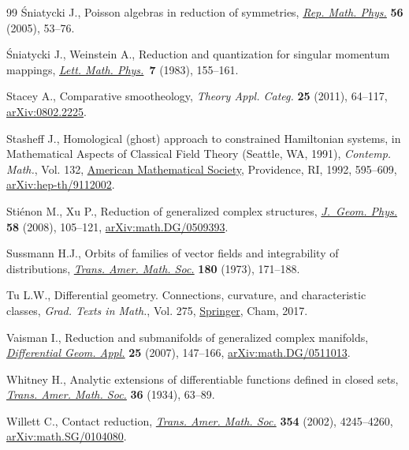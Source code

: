 \begin{thebibliography}{99}
\'Sniatycki J., Poisson algebras in reduction of symmetries, \href{https://doi.org/10.1016/S0034-4877(05)80041-2}{\textit{Rep. Math.
  Phys.}} \textbf{56} (2005), 53--76.

\'Sniatycki J., Weinstein A., Reduction and quantization for singular momentum
  mappings, \href{https://doi.org/10.1007/BF00419934}{\textit{Lett. Math. Phys.}}~\textbf{7} (1983), 155--161.

Stacey A., Comparative smootheology, \textit{Theory Appl. Categ.} \textbf{25}
  (2011), 64--117, \href{https://arxiv.org/abs/0802.2225}{arXiv:0802.2225}.

Stasheff J., Homological (ghost) approach to constrained {H}amiltonian systems,
  in Mathematical Aspects of Classical Field Theory ({S}eattle, {WA}, 1991),
  \textit{Contemp. Math.}, Vol. 132, \href{https://doi.org/10.1090/conm/132/1188459}{American Mathematical Society}, Providence,
  RI, 1992, 595--609, \href{https://arxiv.org/abs/hep-th/9112002}{arXiv:hep-th/9112002}.

Sti\'enon M., Xu P., Reduction of generalized complex structures,
  \href{https://doi.org/10.1016/j.geomphys.2007.09.009}{\textit{J.~Geom. Phys.}} \textbf{58} (2008), 105--121,
  \href{https://arxiv.org/abs/math.DG/0509393}{arXiv:math.DG/0509393}.

Sussmann H.J., Orbits of families of vector fields and integrability of
  distributions, \href{https://doi.org/10.2307/1996660}{\textit{Trans. Amer. Math. Soc.}} \textbf{180} (1973),
  171--188.

Tu L.W., Differential geometry. Connections, curvature, and characteristic
  classes, \textit{Grad. Texts in Math.}, Vol. 275, \href{https://doi.org/10.1007/978-3-319-55084-8}{Springer}, Cham, 2017.

Vaisman I., Reduction and submanifolds of generalized complex manifolds,
  \href{https://doi.org/10.1016/j.difgeo.2006.08.007}{\textit{Differential Geom. Appl.}} \textbf{25} (2007), 147--166,
  \href{https://arxiv.org/abs/math.DG/0511013}{arXiv:math.DG/0511013}.

Whitney H., Analytic extensions of differentiable functions defined in closed
  sets, \href{https://doi.org/10.2307/1989708}{\textit{Trans. Amer. Math. Soc.}} \textbf{36} (1934), 63--89.

Willett C., Contact reduction, \href{https://doi.org/10.1090/S0002-9947-02-03045-3}{\textit{Trans. Amer. Math. Soc.}} \textbf{354}
  (2002), 4245--4260, \href{https://arxiv.org/abs/math.SG/0104080}{arXiv:math.SG/0104080}.

\end{thebibliography}
